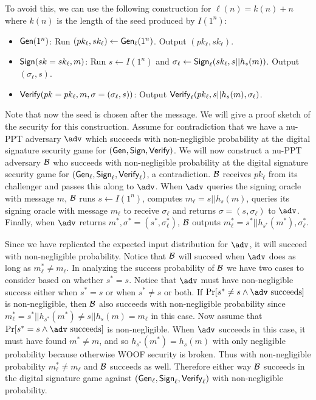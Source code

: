 To avoid this, we can use the following construction for $\ell(n) = k(n) + n$ where $k(n)$ is the length of the seed produced by $I(1^n)$: 
\begin{itemize}
    \item $\mathsf{Gen}(1^n)$: Run $(pk_\ell, sk_\ell) \leftarrow \mathsf{Gen}_\ell(1^n)$. Output $(pk_\ell,sk_\ell)$.

    \item $\mathsf{Sign}(sk=sk_\ell, m)$: Run $s \leftarrow I(1^n)$ and $\sigma_\ell \leftarrow \mathsf{Sign}_\ell(sk_\ell, s || h_s(m))$. Output $(\sigma_\ell, s)$. 

    \item $\mathsf{Verify}(pk=pk_\ell, m, \sigma = (\sigma_\ell, s))$: Output $\mathsf{Verify}_\ell(pk_\ell, s || h_s(m), \sigma_\ell)$. 
\end{itemize}
Note that now the seed is chosen after the message. 
We will give a proof sketch of the security for this construction. 
Assume for contradiction that we have a nu-PPT adversary $\adv$ which succeeds with non-negligible probability at the digital signature security game for $(\mathsf{Gen}, \mathsf{Sign}, \mathsf{Verify})$. 
We will now construct a nu-PPT adversary $\mathcal{B}$ who succeeds with non-negligible probability at the digital signature security game for $(\mathsf{Gen}_\ell, \mathsf{Sign}_\ell, \mathsf{Verify}_\ell)$, a contradiction. 
$\mathcal{B}$ receives $pk_\ell$ from its challenger and passes this along to $\adv$. 
When $\adv$ queries the signing oracle with message $m$, $\mathcal{B}$ runs $s \leftarrow I(1^n)$, computes $m_{\ell} = s || h_{s}(m)$, queries its signing oracle with message $m_{\ell}$ to receive $\sigma_\ell$ and returns $\sigma = (s, \sigma_{\ell})$ to $\adv$. 
Finally, when $\adv$ returns $m^*, \sigma^* = (s^*, \sigma_{\ell}^*)$, $\mathcal{B}$ outputs $m^*_{\ell} = s^* || h_{s^*}(m^*), \sigma_{\ell}^*$. 

Since we have replicated the expected input distribution for $\adv$, it will succeed with non-negligible probability. 
Notice that $\mathcal{B}$ will succeed when $\adv$ does as long as $m^*_{\ell} \not = m_{\ell}$. 
In analyzing the success probability of $\mathcal{B}$ we have two cases to consider based on whether $s^* = s$. 
Notice that $\adv$ must have non-negligible success either when $s^* = s$ or when $s^* \not = s$ or both. 
If $\Pr[s^* \not = s \land \adv \text{ succeeds}]$ is non-negligible, then $\mathcal{B}$ also succeeds with non-negligible probability since $m^*_{\ell} = s^* || h_{s^*}(m^*) \not = s || h_{s}(m) = m_{\ell}$ in this case. 
Now assume that $\Pr[s^* = s \land \adv \text{ succeeds}]$ is non-negligible. When $\adv$ succeeds in this case, it must have found $m^* \not = m$, and so $h_{s^*}(m^*) = h_{s}(m)$ with only negligible probability because otherwise WOOF security is broken. 
Thus with non-negligible probability $m^*_{\ell} \not = m_{\ell}$ and $\mathcal{B}$ succeeds as well. 
Therefore either way $\mathcal{B}$ succeeds in the digital signature game against $(\mathsf{Gen}_\ell, \mathsf{Sign}_\ell, \mathsf{Verify}_\ell)$ with non-negligible probability. 

